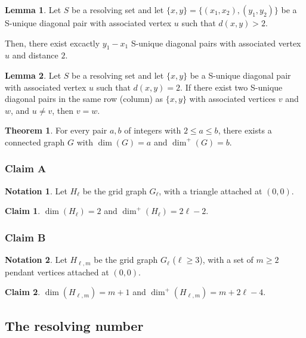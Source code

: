 \documentclass[hyperref={pdfpagelabels=false}]{beamer}
\theoremstyle{definition}
\newtheorem{ntn}{Notation}
\theoremstyle{theorem}
\newtheorem{lem}{Lemma}
\newtheorem{thm}{Theorem}
\newtheorem{clm}{Claim}
\begin{document}
\begin{frame}
	\begin{lem}
		Let $S$ be a resolving set and let $\{x,y\} = \{(x_1,x_2),(y_1,y_2)\}$ be a S-unique diagonal pair with associated vertex $u$ such that $d(x,y)>2$.

		Then, there exist excactly $y_1 - x_1$ S-unique diagonal pairs with associated vertex $u$ and distance $2$.
	\end{lem}
\end{frame}
\begin{frame}
	\begin{lem}
		Let $S$ be a resolving set and let $\{x,y\}$ be a S-unique diagonal pair with associated vertex $u$ such that $d(x,y)=2$. If there exist two S-unique diagonal pairs in the same row (column) as $\{x,y\}$ with associated vertices $v$ and $w$, and $u \neq v$, then $v = w$.
	\end{lem}
\end{frame}
\begin{frame}
	\begin{thm}
		For every pair $a,b$ of integers with $2 \leq a \leq b$, there exists a connected graph $G$ with $\dim(G) = a$ and $\dim^+(G) = b$.
	\end{thm}
\end{frame}
\begin{frame}
	\frametitle{Claim A}
	\begin{ntn}
		Let $H_\ell$ be the grid graph $G_\ell$, with a triangle attached at $(0,0)$.
	\end{ntn}
	\begin{clm}
		$\dim(H_\ell) = 2$ and $\dim^+(H_\ell) = 2\ell - 2$.
	\end{clm}
\end{frame}
\begin{frame}
	\frametitle{Claim B}
	\begin{ntn}
		Let $H_{\ell,m}$ be the grid graph $G_\ell$ ($\ell \geq 3$), with a set of $m \geq 2$ pendant vertices attached at $(0,0)$.
	\end{ntn}
	\begin{clm}
		$\dim(H_{\ell,m}) = m + 1$ and $\dim^+(H_{\ell,m}) = m + 2\ell - 4$.
	\end{clm}
\end{frame}
\subsection{The resolving number}
\end{document}
